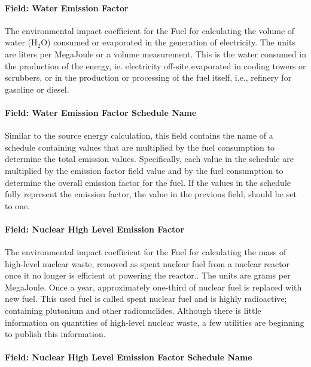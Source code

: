 \paragraph{Field: Water Emission Factor}\label{field-water-emission-factor}

The environmental impact coefficient for the Fuel for calculating the volume of water (H\(_{2}\)O) consumed or evaporated in the generation of electricity. The units are liters per MegaJoule or a volume measurement. This is the water consumed in the production of the energy, ie. electricity off-site evaporated in cooling towers or scrubbers, or in the production or processing of the fuel itself, i.e., refinery for gasoline or diesel.

\paragraph{Field: Water Emission Factor Schedule Name}\label{field-water-emission-factor-schedule-name}

Similar to the source energy calculation, this field contains the name of a schedule containing values that are multiplied by the fuel consumption to determine the total emission values. Specifically, each value in the schedule are multiplied by the emission factor field value and by the fuel consumption to determine the overall emission factor for the fuel. If the values in the schedule fully represent the emission factor, the value in the previous field, should be set to one.

\paragraph{Field: Nuclear High Level Emission Factor}\label{field-nuclear-high-level-emission-factor}

The environmental impact coefficient for the Fuel for calculating the mass of high-level nuclear waste, removed as spent nuclear fuel from a nuclear reactor once it no longer is efficient at powering the reactor.. The units are grams per MegaJoule. Once a year, approximately one-third of nuclear fuel is replaced with new fuel. This used fuel is called spent nuclear fuel and is highly radioactive; containing plutonium and other radionuclides. Although there is little information on quantities of high-level nuclear waste, a few utilities are beginning to publish this information.

\paragraph{Field: Nuclear High Level Emission Factor Schedule Name}\label{field-nuclear-high-level-emission-factor-schedule-name}

